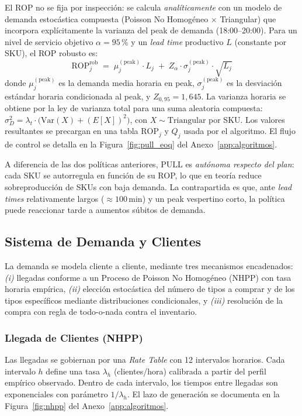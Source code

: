 \documentclass[10pt, a4paper]{article}
\begin{document}
El ROP no se fija por inspecci\'on: se calcula \emph{anal\'iticamente} con un
modelo de demanda estoc\'astica compuesta (Poisson No Homog\'eneo $\times$
Triangular) que incorpora expl\'icitamente la varianza del peak de demanda
(18:00--20:00). Para un nivel de servicio objetivo $\alpha = 95\,\%$ y un
\textit{lead time} productivo $L$ (constante por SKU), el ROP robusto es:
\[
\mathrm{ROP}^{\mathrm{rob}}_j \;=\; \mu^{(\mathrm{peak})}_j \cdot L_j
\;+\; Z_\alpha \cdot \sigma^{(\mathrm{peak})}_j \cdot \sqrt{L_j}
\]
donde $\mu^{(\mathrm{peak})}_j$ es la demanda media horaria en peak,
$\sigma^{(\mathrm{peak})}_j$ es la desviaci\'on est\'andar horaria
condicionada al peak, y $Z_{0{,}95} = 1{,}645$. La varianza horaria se
obtiene por la ley de varianza total para una suma aleatoria compuesta:
$\sigma^2_D = \lambda_t \cdot \bigl( \mathrm{Var}(X) + (E[X])^2 \bigr)$,
con $X \sim \mathrm{Triangular}$ por SKU. Los valores resultantes se
precargan en una tabla $\mathrm{ROP}_j$ y $Q_j$ usada por el algoritmo. El
flujo de control se detalla en la Figura~\ref{fig:pull_eoq} del
Anexo~\ref{app:algoritmos}.

A diferencia de las dos pol\'iticas anteriores, PULL es \emph{aut\'onoma
respecto del plan}: cada SKU se autorregula en funci\'on de su ROP, lo que
en teor\'ia reduce sobreproducci\'on de SKUs con baja demanda. La
contrapartida es que, ante \textit{lead times} relativamente largos
($\approx 100$\,min) y un peak vespertino corto, la pol\'itica puede
reaccionar tarde a aumentos s\'ubitos de demanda.

\subsection{Sistema de Demanda y Clientes}

La demanda se modela cliente a cliente, mediante tres mecanismos
encadenados: \emph{(i)} llegadas conforme a un Proceso de Poisson No
Homog\'eneo (NHPP) con tasa horaria emp\'irica, \emph{(ii)} elecci\'on
estoc\'astica del n\'umero de tipos a comprar y de los tipos espec\'ificos
mediante distribuciones condicionales, y \emph{(iii)} resoluci\'on de la
compra con regla de todo-o-nada contra el inventario.

\subsubsection{Llegada de Clientes (NHPP)}

Las llegadas se gobiernan por una \emph{Rate Table} con 12 intervalos
horarios. Cada intervalo $h$ define una tasa $\lambda_h$ (clientes/hora)
calibrada a partir del perfil emp\'irico observado. Dentro de cada intervalo,
los tiempos entre llegadas son exponenciales con par\'ametro $1/\lambda_h$. El
lazo de generaci\'on se documenta en la Figura~\ref{fig:nhpp} del
Anexo~\ref{app:algoritmos}.
\end{document}
